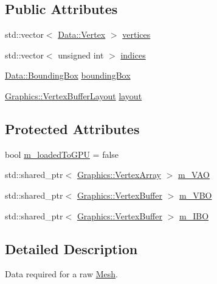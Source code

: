 \subsection*{Public Attributes}
\begin{DoxyCompactItemize}
\item 
std\+::vector$<$ \hyperlink{struct_cookie_eng_1_1_data_1_1_vertex}{Data\+::\+Vertex} $>$ \hyperlink{struct_cookie_eng_1_1_resources_1_1_mesh_aa2d9365b3bb9855de51053a1bbde84a1}{vertices}
\item 
std\+::vector$<$ unsigned int $>$ \hyperlink{struct_cookie_eng_1_1_resources_1_1_mesh_a78ad4658bc848293472999b4708b85ab}{indices}
\item 
\hyperlink{class_cookie_eng_1_1_data_1_1_bounding_box}{Data\+::\+Bounding\+Box} \hyperlink{struct_cookie_eng_1_1_resources_1_1_mesh_aafc1b903c0858196d503b72056bd2f10}{bounding\+Box}
\item 
\hyperlink{class_cookie_eng_1_1_graphics_1_1_vertex_buffer_layout}{Graphics\+::\+Vertex\+Buffer\+Layout} \hyperlink{struct_cookie_eng_1_1_resources_1_1_mesh_a7d60f959cc5a9cadbc59299e207032f2}{layout}
\end{DoxyCompactItemize}
\subsection*{Protected Attributes}
\begin{DoxyCompactItemize}
\item 
bool \hyperlink{struct_cookie_eng_1_1_resources_1_1_mesh_aa244e9f1890ccfa204a3d7df97a3b056}{m\+\_\+loaded\+To\+G\+PU} = false
\item 
std\+::shared\+\_\+ptr$<$ \hyperlink{class_cookie_eng_1_1_graphics_1_1_vertex_array}{Graphics\+::\+Vertex\+Array} $>$ \hyperlink{struct_cookie_eng_1_1_resources_1_1_mesh_a2d54038e4b55e1733fcc7e8c64969767}{m\+\_\+\+V\+AO}
\item 
std\+::shared\+\_\+ptr$<$ \hyperlink{class_cookie_eng_1_1_graphics_1_1_vertex_buffer}{Graphics\+::\+Vertex\+Buffer} $>$ \hyperlink{struct_cookie_eng_1_1_resources_1_1_mesh_a3420e235a3449e5d8f15378b410d89bd}{m\+\_\+\+V\+BO}
\item 
std\+::shared\+\_\+ptr$<$ \hyperlink{class_cookie_eng_1_1_graphics_1_1_vertex_buffer}{Graphics\+::\+Vertex\+Buffer} $>$ \hyperlink{struct_cookie_eng_1_1_resources_1_1_mesh_aff20a2371d9413acc57ab5ff9086fa15}{m\+\_\+\+I\+BO}
\end{DoxyCompactItemize}


\subsection{Detailed Description}
Data required for a raw \hyperlink{struct_cookie_eng_1_1_resources_1_1_mesh}{Mesh}. 

